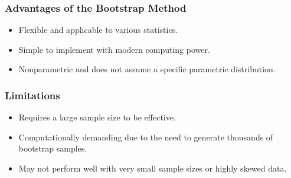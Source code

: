 \documentclass[12pt]{article} %
\begin{document}
\subsubsection{Advantages of the Bootstrap Method}
\begin{itemize}
    \item Flexible and applicable to various statistics.
    \item Simple to implement with modern computing power.
    \item Nonparametric and does not assume a specific parametric distribution.
\end{itemize}

\subsubsection{Limitations}
\begin{itemize}
    \item Requires a large sample size to be effective.
    \item Computationally demanding due to the need to generate thousands of bootstrap samples.
    \item May not perform well with very small sample sizes or highly skewed data.
\end{itemize}
\end{document}
